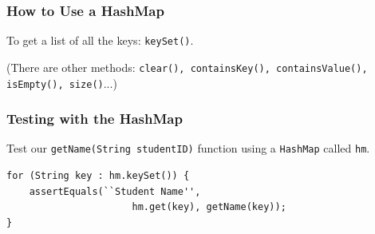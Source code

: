 \begin{frame}
\frametitle{How to Use a HashMap}
\begin{changemargin}{1.5cm}

To get a list of all the keys: \texttt{keySet()}.

(There are other methods: \texttt{clear(), containsKey(), containsValue(), isEmpty(), size()}...)


\end{changemargin}
\end{frame}

\begin{frame}[fragile]
\frametitle{Testing with the HashMap}
\begin{changemargin}{1.5cm}

Test our \texttt{getName(String studentID)} function using a \texttt{HashMap} called \texttt{hm}.

{\small
\begin{verbatim}
for (String key : hm.keySet()) {
    assertEquals(``Student Name'', 
                      hm.get(key), getName(key));
}
\end{verbatim}
}

\end{changemargin}
\end{frame}


